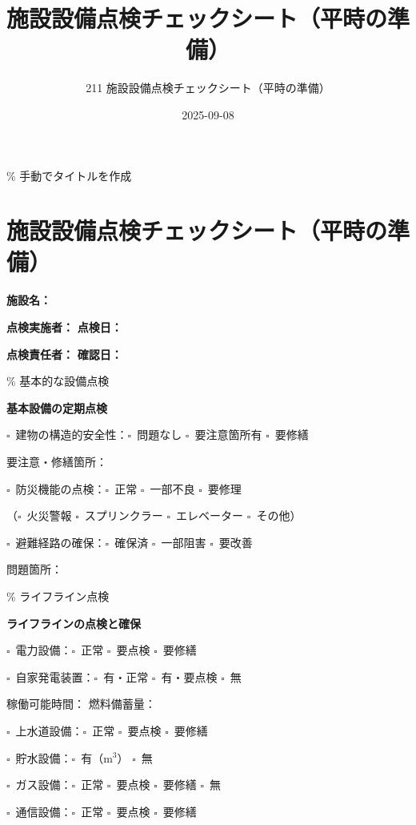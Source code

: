 \documentclass[
  japanese,
]{jarticle}
\title{施設設備点検チェックシート（平時の準備）}
\subtitle{211 施設設備点検チェックシート（平時の準備）}
\author{}
\date{2025-09-08}
\newcommand{\checkbox}{$\square$\ }
\newcommand{\underlinespace}[1]{\underline{\hspace{#1}}}
\begin{document}
\maketitle


\% 手動でタイトルを作成

\section{施設設備点検チェックシート（平時の準備）}\label{ux65bdux8a2dux8a2dux5099ux70b9ux691cux30c1ux30a7ux30c3ux30afux30b7ux30fcux30c8ux5e73ux6642ux306eux6e96ux5099}

\textbf{施設名：} \underlinespace{8cm}

\textbf{点検実施者：} \underlinespace{4cm} \textbf{点検日：}
\underlinespace{3cm}

\textbf{点検責任者：} \underlinespace{4cm} \textbf{確認日：}
\underlinespace{3cm}

\% 基本的な設備点検

\textbf{\large 基本設備の定期点検}

\checkbox 建物の構造的安全性：\checkbox 問題なし \checkbox 要注意箇所有
\checkbox 要修繕

要注意・修繕箇所：\underlinespace{10cm}

\checkbox 防災機能の点検：\checkbox 正常 \checkbox 一部不良
\checkbox 要修理

（\checkbox 火災警報 \checkbox スプリンクラー \checkbox エレベーター
\checkbox その他）

\checkbox 避難経路の確保：\checkbox 確保済 \checkbox 一部阻害
\checkbox 要改善

問題箇所：\underlinespace{10cm}

\% ライフライン点検

\textbf{\large ライフラインの点検と確保}

\checkbox 電力設備：\checkbox 正常 \checkbox 要点検 \checkbox 要修繕

\checkbox 自家発電装置：\checkbox 有・正常 \checkbox 有・要点検
\checkbox 無

稼働可能時間：\underlinespace{3cm} 燃料備蓄量：\underlinespace{3cm}

\checkbox 上水道設備：\checkbox 正常 \checkbox 要点検 \checkbox 要修繕

\checkbox 貯水設備：\checkbox 有（\underlinespace{2cm}m\(^3\)）
\checkbox 無

\checkbox ガス設備：\checkbox 正常 \checkbox 要点検 \checkbox 要修繕
\checkbox 無

\checkbox 通信設備：\checkbox 正常 \checkbox 要点検 \checkbox 要修繕
\end{document}
